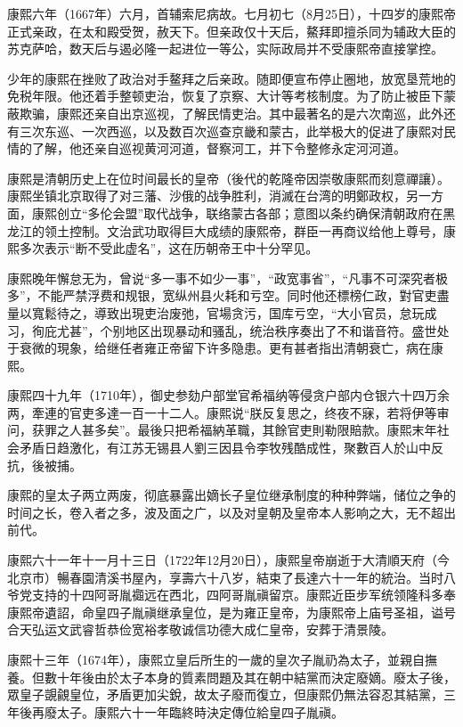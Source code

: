 康熙六年（1667年）六月，首辅索尼病故。七月初七（8月25日），十四岁的康熙帝正式亲政，在太和殿受贺，赦天下。但亲政仅十天后，鰲拜即擅杀同为辅政大臣的苏克萨哈，数天后与遏必隆一起进位一等公，实际政局并不受康熙帝直接掌控。

少年的康熙在挫败了政治对手鳌拜之后亲政。随即便宣布停止圈地，放宽垦荒地的免税年限。他还着手整顿吏治，恢复了京察、大计等考核制度。为了防止被臣下蒙蔽欺骗，康熙还亲自出京巡视，了解民情吏治。其中最著名的是六次南巡，此外还有三次东巡、一次西巡，以及数百次巡查京畿和蒙古，此举极大的促进了康熙对民情的了解，他还亲自巡视黄河河道，督察河工，并下令整修永定河河道。

康熙是清朝历史上在位时间最长的皇帝（後代的乾隆帝因崇敬康熙而刻意禪讓）。康熙坐镇北京取得了对三藩、沙俄的战争胜利，消滅在台湾的明鄭政权，另一方面，康熙创立“多伦会盟”取代战争，联络蒙古各部；意图以条约确保清朝政府在黑龙江的领土控制。文治武功取得巨大成绩的康熙帝，群臣一再商议给他上尊号，康熙多次表示“断不受此虚名”，这在历朝帝王中十分罕见。

康熙晚年懈怠无为，曾说“多一事不如少一事”，“政宽事省”，“凡事不可深究者极多”，不能严禁浮费和规银，宽纵州县火耗和亏空。同时他还標榜仁政，對官吏盡量以寬鬆待之，導致出現吏治废弛，官場贪污，国库亏空，“大小官员，怠玩成习，徇庇尤甚”，个别地区出现暴动和骚乱，统治秩序奏出了不和谐音符。盛世处于衰微的現象，给继任者雍正帝留下许多隐患。更有甚者指出清朝衰亡，病在康熙。

康熙四十九年（1710年），御史参劾户部堂官希福纳等侵贪户部内仓银六十四万余两，牽連的官吏多達一百一十二人。康熙说“朕反复思之，终夜不寐，若将伊等审问，获罪之人甚多矣”。最後只把希福納革職，其餘官吏則勒限賠款。康熙末年社会矛盾日趋激化，有江苏无锡县人劉三因县令李牧残酷成性，聚數百人於山中反抗，後被捕。

康熙的皇太子两立两废，彻底暴露出嫡长子皇位继承制度的种种弊端，储位之争的时间之长，卷入者之多，波及面之广，以及对皇朝及皇帝本人影响之大，无不超出前代。

康熙六十一年十一月十三日（1722年12月20日），康熙皇帝崩逝于大清順天府（今北京市）暢春園清溪书屋內，享壽六十八岁，結束了長達六十一年的統治。当时八爷党支持的十四阿哥胤禵远在西北，四阿哥胤禛留京。康熙近臣步军统领隆科多奉康熙帝遺詔，命皇四子胤禛继承皇位，是为雍正皇帝，为康熙帝上庙号圣祖，谥号合天弘运文武睿哲恭俭宽裕孝敬诚信功德大成仁皇帝，安葬于清景陵。

康熙十三年（1674年），康熙立皇后所生的一歲的皇次子胤礽為太子，並親自撫養。但數十年後由於太子本身的質素問題及其在朝中結黨而決定廢嫡。廢太子後，眾皇子覬覦皇位，矛盾更加尖銳，故太子廢而復立，但康熙仍無法容忍其結黨，三年後再廢太子。康熙六十一年臨終時決定傳位給皇四子胤禛。

